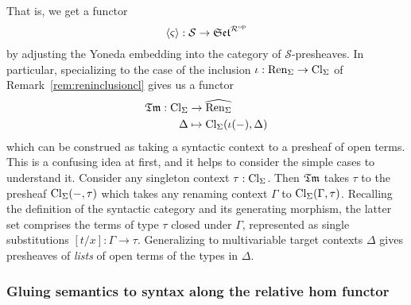 \documentclass[12pt,twoside]{reedthesis}
\theoremstyle{definition}
\theoremstyle{remark}
\theoremstyle{plain}
\begin{document}
That is, we get a functor
\[
  \braket{\varsigma} : \mathcal{S} \rightarrow \mathfrak{Set}^{\mathcal{R}^{\textrm{op}}}
\]
by adjusting the Yoneda embedding into the category of
$\mathcal{S}$-presheaves. In particular, specializing to the case of the
inclusion \( \iota : \text{Ren}_\Sigma \rightarrow \text{Cl}_\Sigma \) of Remark~\ref{rem:reninclusioncl} gives us a
functor
\begin{align*}
  \mathfrak{Tm} : \text{Cl}_\Sigma &\rightarrow \widehat{\text{Ren}_\Sigma} \\
  \Delta &\mapsto \text{Cl}_\Sigma(\iota(-), \Delta)\\
\end{align*}
which can be construed as taking a syntactic context to a presheaf of open
terms. This is a confusing idea at first, and it helps to consider the simple
cases to understand it. Consider any singleton context \( \tau : \text{Cl}_\Sigma \). Then $\mathfrak{Tm}$
takes $\tau$ to the presheaf \( \text{Cl}_\Sigma(-, \tau)\) which takes any renaming context
\( \Gamma \) to \( \text{Cl}_\Sigma(\Gamma, \tau)\). Recalling the definition of the syntactic category
and its generating morphism, the latter set comprises the terms of type \( \tau \)
closed under $\Gamma$, represented as single substitutions \( [t/x] : \Gamma \rightarrow \tau \).
Generalizing to multivariable target contexts \( \Delta \) gives presheaves of
\emph{lists} of open terms of the types in $\Delta$.

\subsubsection{Gluing semantics to syntax along the relative hom functor}
\end{document}

